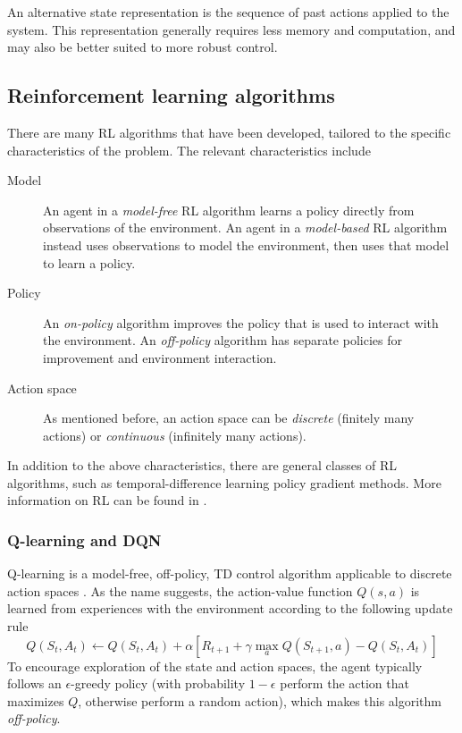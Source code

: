 \documentclass[twocolumn, aps, 10pt]{revtex4-2}
\begin{document}
An alternative state representation is the sequence of past actions applied to the system.  This representation generally requires less memory and computation, and may also be better suited to more robust control.

\subsection{Reinforcement learning algorithms}

There are many RL algorithms that have been developed, tailored to the specific characteristics of the problem. The relevant characteristics include
\begin{description}
    \item[Model] An agent in a \emph{model-free} RL algorithm learns a policy directly from observations of the environment. An agent in a \emph{model-based} RL algorithm instead uses observations to model the environment, then uses that model to learn a policy.
    \item[Policy] An \emph{on-policy} algorithm improves the policy that is used to interact with the environment. An \emph{off-policy} algorithm has separate policies for improvement and environment interaction.
    \item[Action space] As mentioned before, an action space can be \emph{discrete} (finitely many actions) or \emph{continuous} (infinitely many actions).
\end{description}
In addition to the above characteristics, there are general classes of RL algorithms, such as temporal-difference learning policy gradient methods. More information on RL can be found in \cite{sutton2018reinforcement}.

\subsubsection{Q-learning and DQN}

Q-learning is a model-free, off-policy, TD control algorithm applicable to discrete action spaces \cite{watkins1989learning}. As the name suggests, the action-value function $Q(s,a)$ is learned from experiences with the environment according to the following update rule
\begin{equation}\label{eq:Q_learning_update}
    Q(S_t, A_t) \leftarrow Q(S_t, A_t) +
        \alpha \left[ R_{t+1} + \gamma \max_a Q(S_{t+1}, a) - Q(S_t, A_t) \right]
\end{equation}
To encourage exploration of the state and action spaces, the agent typically follows an $\epsilon$-greedy policy (with probability $1-\epsilon$ perform the action that maximizes $Q$, otherwise perform a random action), which makes this algorithm \emph{off-policy}.
\end{document}
